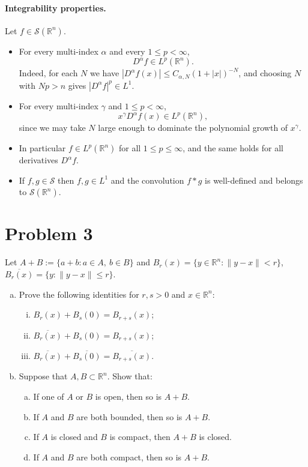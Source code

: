 \documentclass[12pt,a4paper]{article}
\theoremstyle{plain}
\theoremstyle{definition}
\theoremstyle{remark}
\theoremstyle{remark}
\begin{document}
\paragraph{Integrability properties.}
Let $f\in\mathcal{S}(\mathbb{R}^n)$.

\begin{itemize}
	\item For every multi-index $\alpha$ and every $1\le p<\infty$,
	\[
	D^\alpha f\in L^p(\mathbb{R}^n).
	\]
	Indeed, for each $N$ we have
	$|D^\alpha f(x)|\le C_{\alpha,N}(1+|x|)^{-N}$, and choosing
	$N$ with $Np>n$ gives $|D^\alpha f|^p\in L^1$.
	
	\item For every multi-index $\gamma$ and $1\le p<\infty$,
	\[
	x^\gamma D^\alpha f(x)\in L^p(\mathbb{R}^n),
	\]
	since we may take $N$ large enough to dominate the polynomial
	growth of $x^\gamma$.
	
	\item In particular $f\in L^p(\mathbb{R}^n)$ for all $1\le p\le\infty$,
	and the same holds for all derivatives $D^\alpha f$.
	
	\item If $f,g\in\mathcal{S}$ then $f,g\in L^1$ and the convolution
	$f*g$ is well-defined and belongs to $\mathcal{S}(\mathbb{R}^n)$.
\end{itemize}

\section*{Problem 3}

	Let $A+B:=\{a+b:a\in A,\ b\in B\}$ and
	$B_r(x)=\{y\in\mathbb{R}^n:\|y-x\|<r\}$, 
	$\overline{B_r(x)}=\{y:\|y-x\|\le r\}$.
	\begin{enumerate}[(a)]
		\item Prove the following identities for $r,s>0$ and $x\in\mathbb{R}^n$:
		\begin{enumerate}[i)]
			\item $B_r(x)+B_s(0)=B_{r+s}(x)$;
			\item $\overline{B_r(x)}+B_s(0)=B_{r+s}(x)$;
			\item $\overline{B_r(x)}+\overline{B_s(0)}=\overline{B_{r+s}(x)}$.
		\end{enumerate}
		\item Suppose that $A,B\subset\mathbb{R}^n$.
		Show that:
		\begin{enumerate}[b)]
			\item If one of $A$ or $B$ is open, then so is $A+B$.
			\item If $A$ and $B$ are both bounded, then so is $A+B$.
			\item If $A$ is closed and $B$ is compact, then $A+B$ is closed.
			\item If $A$ and $B$ are both compact, then so is $A+B$.
		\end{enumerate}
	\end{enumerate}
\end{document}
